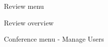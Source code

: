 \documentclass[nochapterpage,nopartpage,noheadingspace,numbersubsubsec,bigchapter,colorback,accentcolor=tud9c,10pt]{tudreport}
\begin{document}
        \begin{figure}
            \centering
            \caption{Review menu}
            \label{fig:review-menu}
        \end{figure}

        \begin{figure}
            \centering
            \caption{Review overview}
            \label{fig:review-overview}
        \end{figure}

        \begin{figure}
            \centering
            \caption{Conference menu - Manage Users}
            \label{fig:conference-menu1}
        \end{figure}
\end{document}
